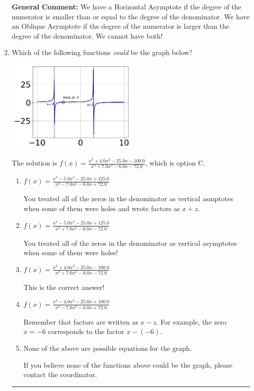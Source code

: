 \documentclass{extbook}[14pt]
\newcommand{\litem}[1]{\item #1

\rule{\textwidth}{0.4pt}}
\begin{document}
\begin{enumerate}
{\textbf{General Comment:} We have a Horizontal Asymptote if the degree of the numerator is smaller than or equal to the degree of the denominator. We have an Oblique Asymptote if the degree of the numerator is larger than the degree of the denominator. We cannot have both!
}
\litem{
Which of the following functions \textit{could} be the graph below?

\begin{center}
    \includegraphics[width=0.5\textwidth]{../Figures/identifyGraphOfRationalFunctionCopyC.png}
\end{center}


The solution is \( f(x)=\frac{x^{3} +4.0 x^{2} -25.0 x -100.0}{x^{3} +7.0 x^{2} -6.0 x -72.0} \), which is option C.\begin{enumerate}[label=\Alph*.]
\item \( f(x)=\frac{x^{3} -5.0 x^{2} -25.0 x + 125.0}{x^{3} -7.0 x^{2} -6.0 x + 72.0} \)

You treated all of the zeros in the denominator as vertical asmptotes when some of them were holes and wrote factors as $x+z$.
\item \( f(x)=\frac{x^{3} -5.0 x^{2} -25.0 x + 125.0}{x^{3} +7.0 x^{2} -6.0 x -72.0} \)

You treated all of the zeros in the denominator as vertical asymptotes when some of them were holes!
\item \( f(x)=\frac{x^{3} +4.0 x^{2} -25.0 x -100.0}{x^{3} +7.0 x^{2} -6.0 x -72.0} \)

This is the correct answer!
\item \( f(x)=\frac{x^{3} -4.0 x^{2} -25.0 x + 100.0}{x^{3} -7.0 x^{2} -6.0 x + 72.0} \)

Remember that factors are written as $x-z$. For example, the zero $x=-6$ corresponds to the factor $x-(-6)$.
\item \( \text{None of the above are possible equations for the graph.} \)

If you believe none of the functions above could be the graph, please contact the coordinator.
\end{enumerate}

}
\end{enumerate}
\end{document}
